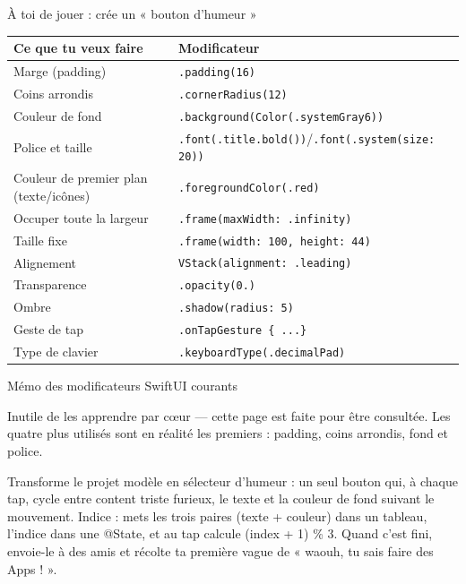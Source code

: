 \begin{tcbpractice}{À toi de jouer : crée un « bouton d'humeur »}

\begin{center}
\begin{tabularx}{\linewidth}{|X|X|}
\hline
\textbf{Ce que tu veux faire} & \textbf{Modificateur} \tabularnewline
\hline
Marge (padding) & \texttt{.\allowbreak padding(16)} \tabularnewline
Coins arrondis & \texttt{.\allowbreak cornerRadius(12)} \tabularnewline
Couleur de fond & \texttt{.\allowbreak background(Color(.\allowbreak systemGray6))} \tabularnewline
Police et taille & \texttt{.\allowbreak font(.\allowbreak title.\allowbreak bold())}/\texttt{.\allowbreak font(.\allowbreak system(size: 20))} \tabularnewline
Couleur de premier plan (texte/icônes) & \texttt{.\allowbreak foregroundColor(.\allowbreak red)} \tabularnewline
Occuper toute la largeur & \texttt{.\allowbreak frame(maxWidth: .\allowbreak infinity)} \tabularnewline
Taille fixe & \texttt{.\allowbreak frame(width: 100, height: 44)} \tabularnewline
Alignement & \texttt{VStack(alignment: .\allowbreak leading)} \tabularnewline
Transparence & \texttt{.\allowbreak opacity(0.\allowbreak 6)} \tabularnewline
Ombre & \texttt{.\allowbreak shadow(radius: 5)} \tabularnewline
Geste de tap & \texttt{.\allowbreak onTapGesture \{ .\allowbreak .\allowbreak .\allowbreak  \}} \tabularnewline
Type de clavier & \texttt{.\allowbreak keyboardType(.\allowbreak decimalPad)} \tabularnewline
\hline
\end{tabularx}
\end{center}

\begin{center}\small\color{gray}Mémo des modificateurs SwiftUI courants\end{center}

Inutile de les apprendre par cœur — cette page est faite pour être consultée. Les quatre plus utilisés sont en réalité les premiers : padding, coins arrondis, fond et police.

Transforme le projet modèle en sélecteur d'humeur : un seul bouton qui, à chaque tap, cycle entre content triste furieux, le texte et la couleur de fond suivant le mouvement. Indice : mets les trois paires (texte + couleur) dans un tableau, l'indice dans une @State, et au tap calcule (index + 1) \% 3. Quand c'est fini, envoie-le à des amis et récolte ta première vague de « waouh, tu sais faire des Apps ! ».

\end{tcbpractice}

